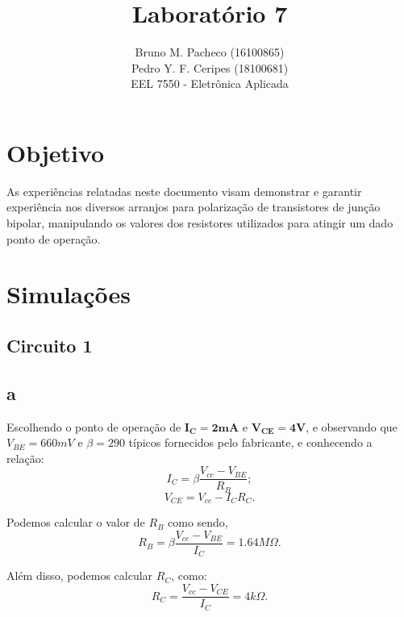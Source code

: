 \documentclass[a4paper]{report}
\begin{document}
 
\title{Laboratório 7}
\author{Bruno M. Pacheco (16100865)\\
Pedro Y. F. Ceripes (18100681) \\
EEL 7550 - Eletrônica Aplicada}

\maketitle
\section*{Objetivo}

As experiências relatadas neste documento visam demonstrar e garantir experiência nos diversos arranjos para polarização de transistores de junção bipolar, manipulando os valores dos resistores utilizados para atingir um dado ponto de operação.

\section*{Simulações}

\subsection*{Circuito 1}
\subsection*{a}

Escolhendo o ponto de operação de $\mathbf{I_C = 2mA}$ e $\mathbf{V_{CE} = 4V}$, e observando que $V_{BE}=660mV$ e $\beta = 290$ típicos fornecidos pelo fabricante, e conhecendo a relação:
\begin{equation}
        I_C = \beta \frac{V_{cc}-V_{BE}}{R_B};
\end{equation}
\begin{equation} 
        V_{CE} = V_{cc} - I_C R_C.
\end{equation}
    
Podemos calcular o valor de $R_B$ como sendo,
\begin{equation*}
    R_B = \beta \frac{V_{cc}-V_{BE}}{I_C} = 1.64 M \Omega.
\end{equation*}

Além disso, podemos calcular $R_C$, como:
\begin{equation*}
    R_C = \frac{V_{cc}-V_{CE}}{I_C} = 4k\Omega.
\end{equation*}
\end{document}
